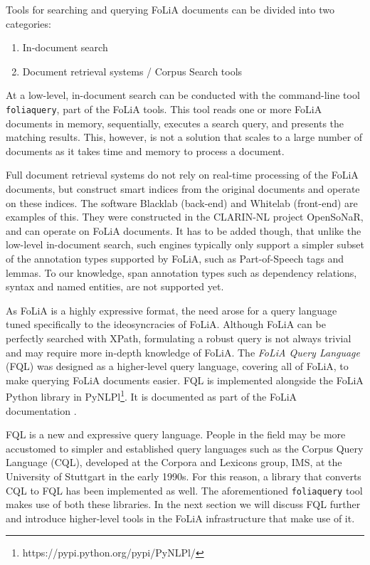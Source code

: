 \documentclass[a4paper,10pt,twoside]{article}
\begin{document}
Tools for searching and querying FoLiA documents can be divided into two
categories:

\begin{enumerate}
 \item In-document search
 \item Document retrieval systems / Corpus Search tools
\end{enumerate}

At a low-level, in-document search can be conducted with the command-line tool
\texttt{foliaquery}, part of the FoLiA tools. This tool reads one or more FoLiA
documents in memory, sequentially, executes a search query, and presents the
matching results. This, however, is not a solution that scales to a large
number of documents as it takes time and memory to process a document.

Full document retrieval systems do not rely on real-time processing of the FoLiA
documents, but construct smart indices from the original documents and operate
on these indices. The software Blacklab (back-end) and Whitelab (front-end) are
examples of this. They were constructed in the CLARIN-NL project OpenSoNaR, and
can operate on FoLiA documents. It has to be added though, that unlike the
low-level in-document search, such engines typically only support a simpler subset of
the annotation types supported by FoLiA, such as Part-of-Speech tags and
lemmas. To our knowledge, span annotation types such as dependency relations,
syntax and named entities, are not supported yet.

As FoLiA is a highly expressive format, the need arose for a query language
tuned specifically to the ideosyncracies of FoLiA. Although FoLiA can be
perfectly searched with XPath, formulating a robust query is not always trivial
and may require more in-depth knowledge of FoLiA. The \emph{FoLiA Query
Language} (FQL) was designed as a higher-level query language, covering all of
FoLiA, to make querying FoLiA documents easier. FQL is implemented alongside
the FoLiA Python library in
PyNLPl\footnote{https://pypi.python.org/pypi/PyNLPl/}. It is documented as part
of the FoLiA documentation \cite{FOLIA}.

FQL is a new and expressive query language. People in the field may be more
accustomed to simpler and established query languages such as the Corpus Query
Language (CQL), developed at the Corpora and Lexicons group, IMS, at the
University of Stuttgart in the early 1990s. For this reason, a library that
converts CQL to FQL has been implemented as well. The aforementioned
\texttt{foliaquery} tool makes use of both these libraries. In the next section
we will discuss FQL further and introduce higher-level tools in the FoLiA
infrastructure that make use of it.
\end{document}
